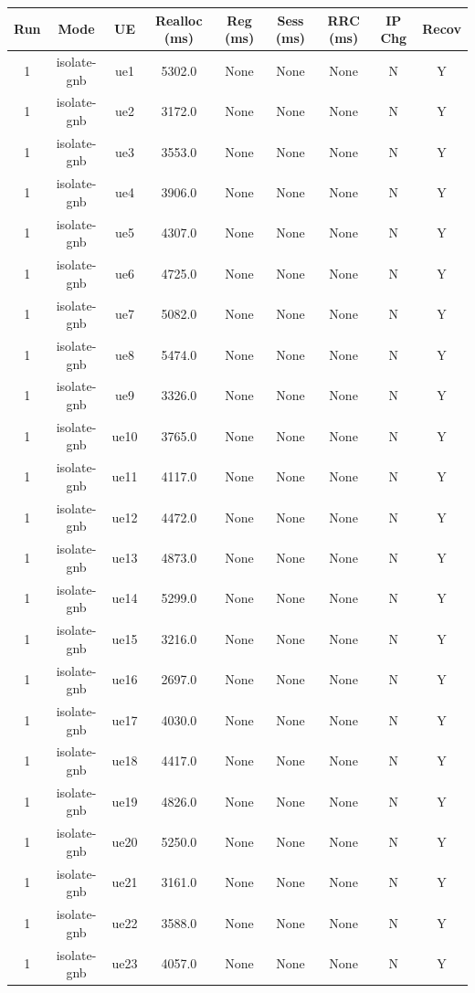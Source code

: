 \begin{table}[ht]
\centering
\begin{tabular}{|c|c|c|c|c|c|c|c|c|}
\hline
Run & Mode & UE & Realloc (ms) & Reg (ms) & Sess (ms) & RRC (ms) & IP Chg & Recov \\
\hline
1 & isolate-gnb & ue1 & 5302.0 & None & None & None & N & Y \\
1 & isolate-gnb & ue2 & 3172.0 & None & None & None & N & Y \\
1 & isolate-gnb & ue3 & 3553.0 & None & None & None & N & Y \\
1 & isolate-gnb & ue4 & 3906.0 & None & None & None & N & Y \\
1 & isolate-gnb & ue5 & 4307.0 & None & None & None & N & Y \\
1 & isolate-gnb & ue6 & 4725.0 & None & None & None & N & Y \\
1 & isolate-gnb & ue7 & 5082.0 & None & None & None & N & Y \\
1 & isolate-gnb & ue8 & 5474.0 & None & None & None & N & Y \\
1 & isolate-gnb & ue9 & 3326.0 & None & None & None & N & Y \\
1 & isolate-gnb & ue10 & 3765.0 & None & None & None & N & Y \\
1 & isolate-gnb & ue11 & 4117.0 & None & None & None & N & Y \\
1 & isolate-gnb & ue12 & 4472.0 & None & None & None & N & Y \\
1 & isolate-gnb & ue13 & 4873.0 & None & None & None & N & Y \\
1 & isolate-gnb & ue14 & 5299.0 & None & None & None & N & Y \\
1 & isolate-gnb & ue15 & 3216.0 & None & None & None & N & Y \\
1 & isolate-gnb & ue16 & 2697.0 & None & None & None & N & Y \\
1 & isolate-gnb & ue17 & 4030.0 & None & None & None & N & Y \\
1 & isolate-gnb & ue18 & 4417.0 & None & None & None & N & Y \\
1 & isolate-gnb & ue19 & 4826.0 & None & None & None & N & Y \\
1 & isolate-gnb & ue20 & 5250.0 & None & None & None & N & Y \\
1 & isolate-gnb & ue21 & 3161.0 & None & None & None & N & Y \\
1 & isolate-gnb & ue22 & 3588.0 & None & None & None & N & Y \\
1 & isolate-gnb & ue23 & 4057.0 & None & None & None & N & Y \\

\end{tabular}
\end{table}
